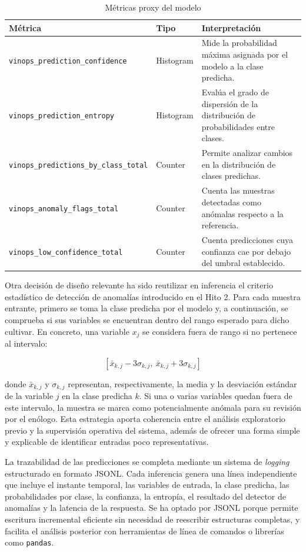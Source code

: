 \begin{table}[h]
\centering
\caption{Métricas proxy del modelo}
\vspace{0.2cm}
\begin{tabular}{l l p{7.2cm}}
\hline
\textbf{Métrica} & \textbf{Tipo} & \textbf{Interpretación} \\
\hline
\texttt{vinops\_prediction\_confidence} & Histogram & Mide la probabilidad máxima asignada por el modelo a la clase predicha. \\
\texttt{vinops\_prediction\_entropy} & Histogram & Evalúa el grado de dispersión de la distribución de probabilidades entre clases. \\
\texttt{vinops\_predictions\_by\_class\_total} & Counter & Permite analizar cambios en la distribución de clases predichas. \\
\texttt{vinops\_anomaly\_flags\_total} & Counter & Cuenta las muestras detectadas como anómalas respecto a la referencia. \\
\texttt{vinops\_low\_confidence\_total} & Counter & Cuenta predicciones cuya confianza cae por debajo del umbral establecido. \\
\hline
\end{tabular}
\label{tab:metricas_proxy_hito5}
\end{table}

Otra decisión de diseño relevante ha sido reutilizar en inferencia el criterio estadístico de detección de anomalías introducido en el Hito 2. Para cada muestra entrante, primero se toma la clase predicha por el modelo y, a continuación, se comprueba si sus variables se encuentran dentro del rango esperado para dicho cultivar. En concreto, una variable \(x_j\) se considera fuera de rango si no pertenece al intervalo:

\[
[\bar{x}_{k,j} - 3\sigma_{k,j},\ \bar{x}_{k,j} + 3\sigma_{k,j}]
\]

donde \(\bar{x}_{k,j}\) y \(\sigma_{k,j}\) representan, respectivamente, la media y la desviación estándar de la variable \(j\) en la clase predicha \(k\). Si una o varias variables quedan fuera de este intervalo, la muestra se marca como potencialmente anómala para su revisión por el enólogo. Esta estrategia aporta coherencia entre el análisis exploratorio previo y la supervisión operativa del sistema, además de ofrecer una forma simple y explicable de identificar entradas poco representativas.

La trazabilidad de las predicciones se completa mediante un sistema de \textit{logging} estructurado en formato JSONL. Cada inferencia genera una línea independiente que incluye el instante temporal, las variables de entrada, la clase predicha, las probabilidades por clase, la confianza, la entropía, el resultado del detector de anomalías y la latencia de la respuesta. Se ha optado por JSONL porque permite escritura incremental eficiente sin necesidad de reescribir estructuras completas, y facilita el análisis posterior con herramientas de línea de comandos o librerías como \texttt{pandas}.

